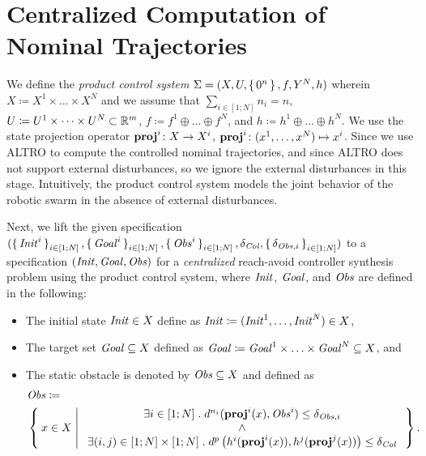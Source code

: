 
\section{Centralized Computation of Nominal Trajectories}\label{sec:nominal trajectory}
We define the \emph{product control system} $\Sigma = (X, U, \set{0^n}, f, Y^N, h)$ wherein $X\coloneqq X^1\times \ldots \times X^N$ and we assume that $\sum_{i\in [1;N]} n_i=n$, $U\coloneqq U^1\times\dots\times U^N\subset \mathbb{R}^m$, $f\coloneqq f^{1}\oplus \ldots\oplus f^{N}$, and $h\coloneqq h^1\oplus \ldots \oplus h^N$. 
We use the state projection operator $\mathbf{proj}^{i}\colon X\to X^i$, $\mathbf{proj}^{i}\colon (x^1,\ldots,x^N)\mapsto x^i$.
Since we use ALTRO to compute the controlled nominal trajectories, and since ALTRO does not support external disturbances, so we ignore the external disturbances in this stage.
Intuitively, the product control system models the joint behavior of the robotic swarm in the absence of external disturbances.

Next, we lift the given specification $(\set{\mathit{Init}^i}_{i\in [1;N]}, \set{\mathit{Goal}^i}_{i\in [1;N]}, \set{\mathit{Obs}^i}_{i\in [1;N]}, \delta_{\mathit{Col}}, \set{\delta_{\mathit{Obs},i}}_{i\in [1;N]})$ to a specification $(\mathit{Init}, \mathit{Goal}, \mathit{Obs})$ for a \emph{centralized} reach-avoid controller synthesis problem using the product control system, where $\mathit{Init}$, $\mathit{Goal}$, and $\mathit{Obs}$ are defined in the following:
\begin{itemize}
	\item The initial state $\mathit{Init}\in X$ define as $\mathit{Init} \coloneqq (\mathit{Init}^1, \ldots, \mathit{Init}^N) \in X$,
	\item The target set $\mathit{Goal}\subseteq X$ defined as $\mathit{Goal} \coloneqq \mathit{Goal}^1\times \ldots \times \mathit{Goal}^N \subseteq X$, and
	\item The static obstacle is denoted by $\mathit{Obs}\subseteq X$ and defined as 
		\begin{align}
			&\mathit{Obs} \coloneqq\\ 
				&\Set{ x\in X | 
					\begin{array}{c}
						\exists i\in [1;N]\;.\; d^{n_i}(\mathbf{proj}^i(x),\mathit{Obs}^i) \leq \delta_{\mathit{Obs},i}\\
						\wedge\\
						 \exists (i,j)\in [1;N]\times [1;N]\;.\; d^{p}\left(h^i(\mathbf{proj}^i(x)),h^j(\mathbf{proj}^j(x))\right)\leq\delta_{\mathit{Col}}
					\end{array}}.
		\end{align}
\end{itemize}

